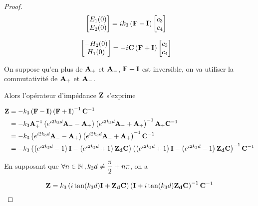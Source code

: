\begin{proof}
    \begin{align}
        \begin{bmatrix}
            E_1(0)\\
            E_2(0)\\
        \end{bmatrix}
        &=ik_3\left(\mathbf{F} - \mathbf{I} \right)
        \begin{bmatrix}
            c_3 \\
            c_4
        \end{bmatrix}
    \end{align}

    \begin{align}
        \begin{bmatrix}
            -H_2(0)\\
            H_1(0)\\
        \end{bmatrix}
        &=-i\mathbf{C} \left(  \mathbf{F} + \mathbf{I}  \right)
        \begin{bmatrix}
                c_3 \\
                c_4
        \end{bmatrix}
    \end{align}

    On suppose qu'en plus de $\mathbf{A}_+$ et $\mathbf{A}_-$, $\mathbf{F} + \mathbf{I}$ est inversible, on va utiliser la commutativité de $\mathbf{A}_+$ et $\mathbf{A}_-$.

    Alors l'opérateur d'impédance $\mathbf{Z}$ s'exprime

    \begin{align}
        \mathbf{Z}
        &=-k_3\left(\mathbf{F} - \mathbf{I} \right)\left(\mathbf{F}+ \mathbf{I} \right)^{-1}\mathbf{C}^{-1}
        \\
        &=-k_3\mathbf{A}_+^{-1}\left(e^{i2 k_3 d}\mathbf{A}_- - \mathbf{A}_+ \right)\left(e^{i2 k_3 d}\mathbf{A}_- + \mathbf{A}_+ \right)^{-1}\mathbf{A}_+\mathbf{C}^{-1}
        \\
        &= -k_3\left( e^{i2 k_3 d} \mathbf{A}_- -  \mathbf{A}_+\right)
        \left( e^{i2 k_3 d} \mathbf{A}_- + \mathbf{A}_+ \right)^{-1}\mathbf{C}^{-1}
        \\
        &= -k_3\left(\left( e^{i2 k_3 d} - 1 \right)\mathbf{I} - \left( e^{i2 k_3 d} + 1 \right) \mathbf{Z_d}\mathbf{C} \right)
        \left( \left( e^{i2 k_3 d} + 1 \right)\mathbf{I} - \left( e^{i2 k_3 d} - 1 \right)\mathbf{Z_d}\mathbf{C} \right)^{-1}\mathbf{C}^{-1}   
    \end{align}

    En supposant que $\forall n \in \mathbb N \,, k_3d\not = \dfrac{\pi}{2}+n\pi$, on a

    \begin{equation}
    \mathbf{Z} = k_3\left(i\tan(k_3 d)\mathbf{I} + \mathbf{Z_d}\mathbf{C} \right)
        \left( \mathbf{I} + i\tan(k_3 d)\mathbf{Z_d}\mathbf{C} \right)^{-1}\mathbf{C}^{-1} 
    \end{equation}


\end{proof}
